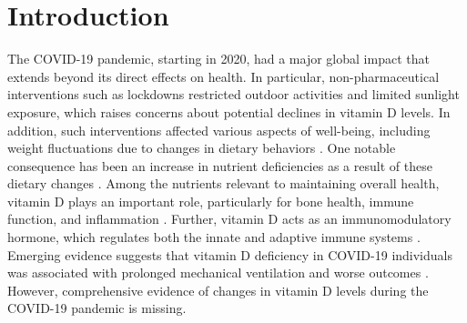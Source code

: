 \documentclass[12pt]{article}
\begin{document}
\flushbottom
\maketitle
\thispagestyle{empty}


\sloppy
\raggedbottom


\newpage
\section*{Introduction}
\label{sec:introduction}

The COVID-19 pandemic, starting in 2020, had a major global impact that extends beyond its direct effects on health. In particular, non-pharmaceutical interventions such as lockdowns restricted outdoor activities \cite{Hsiang2020, Persson2021} and limited sunlight exposure, which raises concerns about potential declines in vitamin D levels. In addition, such interventions affected various aspects of well-being, including weight fluctuations due to changes in dietary behaviors \cite{Rousham2024, Bhutani2021}. One notable consequence has been an increase in nutrient deficiencies as a result of these dietary changes \cite{Antwi2021}. Among the nutrients relevant to maintaining overall health, vitamin D plays an important role, particularly for bone health, immune function, and inflammation \cite{Holick2011, Aranow2011, BischoffFerrari2004}. Further, vitamin D acts as an immunomodulatory hormone, which regulates both the innate and adaptive immune systems \cite{Charoenngam2020,Bikle2009,Aranow2011}. Emerging evidence suggests that vitamin D deficiency in COVID-19 individuals was associated with prolonged mechanical ventilation and worse outcomes \cite{Notz2022}. However, comprehensive evidence of changes in vitamin D levels during the COVID-19 pandemic is missing.
\end{document}
